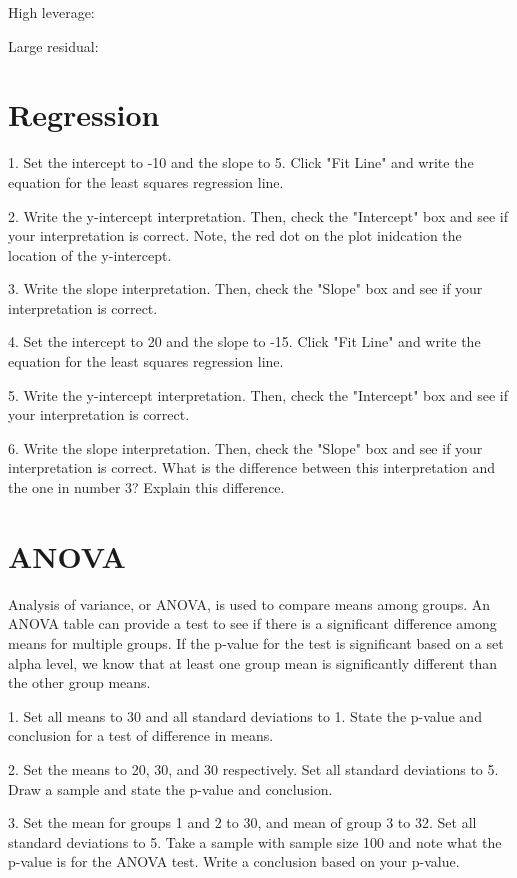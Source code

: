 \documentclass[11pt]{amsart}
\begin{document}
High leverage:

Large residual:


\section{Regression}
1.  Set the intercept to -10 and the slope to 5. Click "Fit Line" and write the equation for the least squares regression line.

2. Write the y-intercept interpretation. Then, check the "Intercept" box and see if your interpretation is correct. Note, the red dot on the plot inidcation the location of the y-intercept.

3. Write the slope interpretation. Then, check the "Slope" box and see if your interpretation is correct.

4.   Set the intercept to 20 and the slope to -15. Click "Fit Line" and write the equation for the least squares regression line.

5. Write the y-intercept interpretation. Then, check the "Intercept" box and see if your interpretation is correct.

6. Write the slope interpretation. Then, check the "Slope" box and see if your interpretation is correct. What is the difference between this interpretation and the one in number 3? Explain this difference.



\section{ANOVA}
Analysis of variance, or ANOVA, is used to compare means among groups.  An ANOVA table can provide a test to see if there is a significant difference among means for multiple groups. If the p-value for the test is significant based on a set alpha level, we know that at least one group mean is significantly different than the other group means.

1. Set all means to 30 and all standard deviations to 1.  State the p-value and conclusion for a test of difference in means.

2.  Set the means to 20, 30, and 30 respectively.  Set all standard deviations to 5.  Draw a sample and state the p-value and conclusion.  

3. Set the mean for groups 1 and 2 to 30, and mean of group 3 to 32.  Set all standard deviations to 5.  Take a sample with sample size 100 and note what the p-value is for the ANOVA test.  Write a conclusion based on your p-value.
\end{document}
